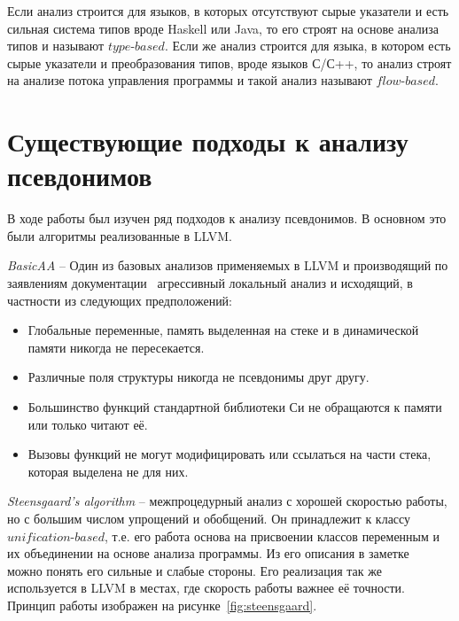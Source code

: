 \begin{mydefinition}
Если анализ строится для языков, в которых отсутствуют сырые указатели и есть сильная система типов вроде Haskell или Java, то его строят на основе анализа типов и называют $type$-$based$. Если же анализ строится для языка, в котором есть сырые указатели и преобразования типов, вроде языков С/С++, то анализ строят на анализе потока управления программы и такой анализ называют $flow$-$based$.
\end{mydefinition}

\section{Существующие подходы к анализу псевдонимов}

В ходе работы был изучен ряд подходов к анализу псевдонимов. В основном это были алгоритмы реализованные в LLVM. 

\textit{BasicAA} -- Один из базовых анализов применяемых в LLVM и производящий по заявлениям документации~\autocite{LLVMAAI} агрессивный локальный анализ и исходящий, в частности из следующих предположений:
\begin{itemize}
\item Глобальные переменные, память выделенная на стеке и в динамической памяти никогда не пересекается.
\item Различные поля структуры никогда не псевдонимы друг другу.
\item Большинство функций стандартной библиотеки Си не обращаются к памяти или только читают её.
\item Вызовы функций не могут модифицировать или ссылаться на части стека, которая выделена не для них.
\end{itemize}

\textit{Steensgaard’s algorithm} -- межпроцедурный анализ с хорошей скоростью работы, но с большим числом упрощений и обобщений. Он принадлежит к классу $unification$-$based$, т.е. его работа основа на присвоении классов переменным и их объединении на основе анализа программы. Из его описания в заметке~\autocite{SteensgaardsNote} можно понять его сильные и слабые стороны. Его реализация так же используется в LLVM в местах, где скорость работы важнее её точности. Принцип работы изображен на рисунке~\ref{fig:steensgaard}.

